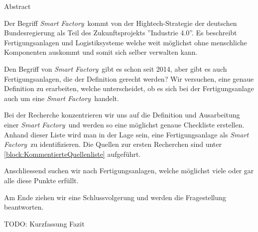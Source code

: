 \documentclass{article}
\def\SmartFactory{\textcolor{DarkestGray}{\textit{Smart Factory}}}
\begin{document}
\begin{Map}{Abstract}

Der Begriff \SmartFactory\ kommt von der Hightech-Strategie der deutschen Bundesregierung als Teil des Zukunftsprojekts ''Industrie 4.0''\cite{WasIndustrie40}. Es beschreibt Fertigungsanlagen und Logistiksysteme welche weit möglichst ohne menschliche Komponenten auskommt und somit sich selber verwalten kann\cite{Industrie40TippsUmsetzung}.

Den Begriff von \SmartFactory\ gibt es schon seit 2014, aber gibt es auch Fertigungsanlagen, die der Definition gerecht werden?
Wir versuchen, eine genaue Definition zu erarbeiten, welche unterscheidet, ob es sich bei der Fertigungsanlage auch um eine \SmartFactory\ handelt.

Bei der Recherche konzentrieren wir uns auf die Definition und Ausarbeitung einer \SmartFactory\ und werden so eine möglichst genaue Checkliste erstellen. Anhand dieser Liste wird man in der Lage sein, eine Fertigungsanlage als \SmartFactory\ zu identifizieren. Die Quellen zur ersten Recherchen sind unter \ref{block:KommentierteQuellenliste} aufgeführt. \par

Anschliessend suchen wir nach Fertigungsanlagen, welche möglichst viele oder gar alle diese Punkte erfüllt. \par

Am Ende ziehen wir eine Schlussvolgerung und werden die Fragestellung beantworten.

TODO: Kurzfassung Fazit

\end{Map}
\end{document}
